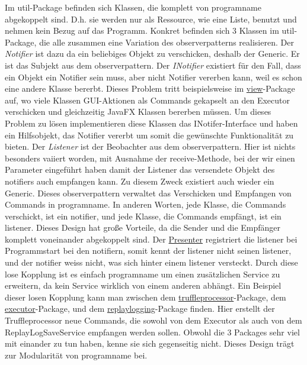 \medskip
Im util-Package befinden sich Klassen, die komplett von \gls{programname} abgekoppelt
sind. D.h. sie werden nur als Ressource, wie eine Liste, benutzt und nehmen kein
Bezug auf das Programm.\newline
Konkret befinden sich 3 Klassen im util-Package, die alle zusammen eine
Variation des \gls{observerpattern}s realisieren. Der \textit{Notifier} ist dazu da
ein beliebiges Objekt zu verschicken, deshalb der Generic. Er ist das Subjekt aus
dem \gls{observerpattern}.
\newline
\newline
Der \textit{INotifier} existiert für den Fall, dass ein
Objekt ein Notifier sein muss, aber nicht Notifier vererben kann, weil es
schon eine andere Klasse bererbt. Dieses Problem tritt beispielsweise im
\hyperref[subsec:view]{view}-Package auf, wo viele Klassen GUI-Aktionen als Commands
gekapselt an den Executor verschicken und gleichzeitig JavaFX Klassen bererben müssen.
Um dieses Problem zu lösen implementieren diese Klassen das INotifer-Interface
und haben ein Hilfsobjekt, das Notifier vererbt um somit die gewünschte Funktionalität zu
bieten.
\newline
\newline
Der \textit{Listener} ist der Beobachter aus dem \gls{observerpattern}. Hier ist nichts
besonders vaiiert worden, mit Ausnahme der receive-Methode, bei der wir einen Parameter eingeführt
haben damit der Listener das versendete Objekt des \gls{notifier}s auch empfangen kann.
Zu diesem Zweck existiert auch wieder ein Generic.
\newline
\newline
Dieses \gls{observerpattern} verwaltet das Verschicken und Empfangen von Commands in
\gls{programname}. In anderen Worten, jede Klasse, die Commands verschickt, ist ein
\gls{notifier}, und jede Klasse, die Commands empfängt, ist ein \gls{listener}. Dieses Design
hat große Vorteile, da die Sender und die Empfänger komplett voneinander abgekoppelt
sind. Der \hyperref[subsec:presenter]{Presenter} registriert die \gls{listener} bei Programmstart
bei den \gls{notifier}n, somit kennt der \gls{listener} nicht seinen \gls{listener}, und der
\gls{notifier} weiss nicht, was sich hinter einem \gls{listener} versteckt. Durch diese lose
Kopplung ist es einfach \gls{programname} um einen zusätzlichen Service zu erweitern,
da kein Service wirklich von einem anderen abhängt.
\newline
\newline
Ein Beispiel dieser losen Kopplung kann man zwischen dem
\hyperref[subsubsec:truffleprocessor]{truffleprocessor}-Package, dem
\hyperref[subsubsec:executor]{executor}-Package, und dem
\hyperref[subsubsec:replaylogging]{replaylogging}-Package finden. Hier erstellt
der Truffleprocessor neue Commands, die sowohl von dem Executor als auch von dem
ReplayLogSaveService empfangen werden sollen. Obwohl die 3 Packages sehr viel
mit einander zu tun haben, kenne sie sich gegenseitig nicht. Dieses Design
trägt zur Modularität von \gls{programname} bei.

